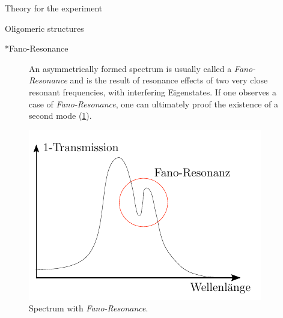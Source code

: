 \documentclass[pdftex, a4paper,11pt, twoside, UKenglish]{report}
\begin{document}
\begin{chapter}{Theory for the experiment}
\begin{section}{Oligomeric structures}
      \begin{subsection}*{Fano-Resonance}
        \begin{figure}[ht!]
          \begin{minipage}[b]{.48\textwidth}
            An asymmetrically formed spectrum is usually called a
            \textit{Fano-Resonance} and is the result of resonance effects of
            two very close resonant frequencies, with interfering Eigenstates.
            If one observes a case of \textit{Fano-Resonance}, one can
            ultimately proof the existence of a second mode (\cref{fig:Fano}).
          \end{minipage}\quad
          \begin{minipage}{.48\textwidth}
            \includegraphics[width=\textwidth]{Figures/Fano.png}
            \caption{Spectrum with \textit{Fano-Resonance}.}
            \label{fig:Fano}
          \end{minipage}
        \end{figure}
      \end{subsection}
      
      
      

\end{section}
\end{chapter}
\end{document}
